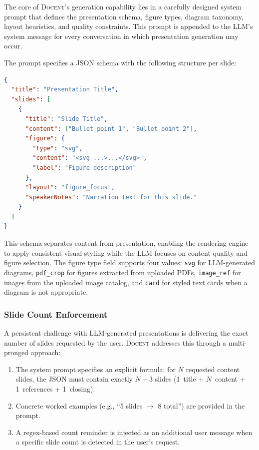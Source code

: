 \documentclass[11pt,a4paper]{article}
\newcommand{\system}{\textsc{Docent}\xspace}
\begin{document}
The core of \system's generation capability lies in a carefully designed system prompt that defines the presentation schema, figure types, diagram taxonomy, layout heuristics, and quality constraints.
This prompt is appended to the LLM's system message for every conversation in which presentation generation may occur.

The prompt specifies a JSON schema with the following structure per slide:

\begin{lstlisting}[language=json,caption={Slide JSON schema (simplified).},label={lst:schema}]
{
  "title": "Presentation Title",
  "slides": [
    {
      "title": "Slide Title",
      "content": ["Bullet point 1", "Bullet point 2"],
      "figure": {
        "type": "svg",
        "content": "<svg ...>...</svg>",
        "label": "Figure description"
      },
      "layout": "figure_focus",
      "speakerNotes": "Narration text for this slide."
    }
  ]
}
\end{lstlisting}

This schema separates content from presentation, enabling the rendering engine to apply consistent visual styling while the LLM focuses on content quality and figure selection.
The figure type field supports four values: \texttt{svg} for LLM-generated diagrams, \texttt{pdf\_crop} for figures extracted from uploaded PDFs, \texttt{image\_ref} for images from the uploaded image catalog, and \texttt{card} for styled text cards when a diagram is not appropriate.

\subsubsection{Slide Count Enforcement}

A persistent challenge with LLM-generated presentations is delivering the exact number of slides requested by the user.
\system addresses this through a multi-pronged approach:

\begin{enumerate}[leftmargin=*,nosep]
    \item The system prompt specifies an explicit formula: for $N$ requested content slides, the JSON must contain exactly $N+3$ slides (1~title + $N$~content + 1~references + 1~closing).
    \item Concrete worked examples (e.g., ``5 slides $\rightarrow$ 8 total'') are provided in the prompt.
    \item A regex-based count reminder is injected as an additional user message when a specific slide count is detected in the user's request.
\end{enumerate}
\end{document}
